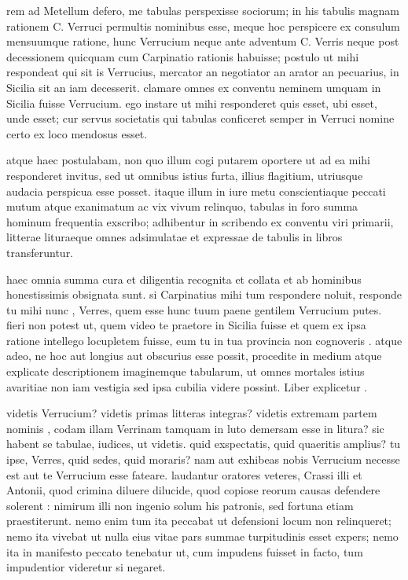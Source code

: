  rem ad Metellum defero, me tabulas perspexisse sociorum; in his tabulis magnam rationem C. Verruci permultis nominibus esse, meque hoc perspicere ex consulum mensuumque ratione, hunc Verrucium neque ante adventum C. Verris neque post decessionem quicquam cum Carpinatio rationis habuisse; postulo ut mihi respondeat qui sit is Verrucius, mercator an negotiator an arator an pecuarius, in Sicilia sit an iam decesserit. clamare omnes ex conventu neminem umquam in Sicilia fuisse Verrucium. ego instare ut mihi responderet quis esset, ubi esset, unde esset; cur servus societatis qui tabulas conficeret semper in Verruci nomine certo ex loco mendosus esset.

 atque haec postulabam, non quo illum cogi putarem oportere ut ad ea mihi responderet invitus, sed ut omnibus istius furta, illius flagitium, utriusque audacia perspicua esse posset. itaque illum in iure metu conscientiaque peccati mutum atque exanimatum ac vix vivum relinquo, tabulas in foro summa hominum frequentia exscribo; adhibentur in scribendo ex conventu viri primarii, litterae lituraeque omnes adsimulatae et expressae de tabulis in libros transferuntur.

 haec omnia summa cura et diligentia recognita et collata et ab hominibus honestissimis obsignata sunt. si Carpinatius mihi tum respondere noluit, responde tu mihi nunc , Verres, quem esse hunc tuum paene gentilem Verrucium putes. fieri non potest ut, quem video te praetore in Sicilia fuisse et quem ex ipsa ratione intellego locupletem fuisse, eum tu in tua provincia non cognoveris . atque adeo, ne hoc aut longius aut obscurius esse possit, procedite in medium atque explicate descriptionem imaginemque tabularum, ut omnes mortales istius avaritiae non iam vestigia sed ipsa cubilia videre possint. Liber explicetur .

 videtis Verrucium? videtis primas litteras integras? videtis extremam partem nominis , codam illam Verrinam tamquam in luto demersam esse in litura? sic habent se tabulae, iudices, ut videtis. quid exspectatis, quid quaeritis amplius? tu ipse, Verres, quid sedes, quid moraris? nam aut exhibeas nobis Verrucium necesse est aut te Verrucium esse fateare. laudantur oratores veteres, Crassi illi et Antonii, quod crimina diluere dilucide, quod copiose reorum causas defendere solerent : nimirum illi non ingenio solum his patronis, sed fortuna etiam praestiterunt. nemo enim tum ita peccabat ut defensioni locum non relinqueret; nemo ita vivebat ut nulla eius vitae pars summae turpitudinis esset expers; nemo ita in manifesto peccato tenebatur ut, cum impudens fuisset in facto, tum impudentior videretur si negaret.

